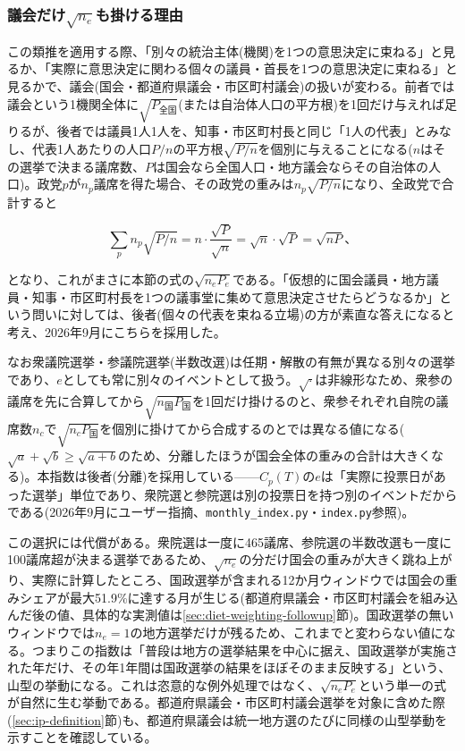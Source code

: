 \documentclass[a4paper,11pt]{ltjsarticle}
\begin{document}
\subsubsection{議会だけ$\sqrt{n_e}$も掛ける理由}

この類推を適用する際、「別々の統治主体(機関)を1つの意思決定に束ねる」と見るか、「実際に意思決定に関わる個々の議員・首長を1つの意思決定に束ねる」と見るかで、議会(国会・都道府県議会・市区町村議会)の扱いが変わる。前者では議会という1機関全体に$\sqrt{P_{\text{全国}}}$(または自治体人口の平方根)を1回だけ与えれば足りるが、後者では議員1人1人を、知事・市区町村長と同じ「1人の代表」とみなし、代表1人あたりの人口$P/n$の平方根$\sqrt{P/n}$を個別に与えることになる($n$はその選挙で決まる議席数、$P$は国会なら全国人口・地方議会ならその自治体の人口)。政党$p$が$n_p$議席を得た場合、その政党の重みは$n_p\sqrt{P/n}$になり、全政党で合計すると

\[
\sum_p n_p\sqrt{P/n} = n\cdot\frac{\sqrt{P}}{\sqrt{n}} = \sqrt{n}\cdot\sqrt{P} = \sqrt{n P}、
\]

となり、これがまさに本節の式の$\sqrt{n_eP_e}$である。「仮想的に国会議員・地方議員・知事・市区町村長を1つの議事堂に集めて意思決定させたらどうなるか」という問いに対しては、後者(個々の代表を束ねる立場)の方が素直な答えになると考え、2026年9月にこちらを採用した。

なお衆議院選挙・参議院選挙(半数改選)は任期・解散の有無が異なる別々の選挙であり、$e$としても常に別々のイベントとして扱う。$\sqrt{\cdot}$は非線形なため、衆参の議席を先に合算してから$\sqrt{n_{\text{国}}P_{\text{国}}}$を1回だけ掛けるのと、衆参それぞれ自院の議席数$n_c$で$\sqrt{n_cP_{\text{国}}}$を個別に掛けてから合成するのとでは異なる値になる($\sqrt{a}+\sqrt{b} \geq \sqrt{a+b}$のため、分離したほうが国会全体の重みの合計は大きくなる)。本指数は後者(分離)を採用している——$C_p(T)$の$e$は「実際に投票日があった選挙」単位であり、衆院選と参院選は別の投票日を持つ別のイベントだからである(2026年9月にユーザー指摘、\texttt{monthly\_index.py}・\texttt{index.py}参照)。

この選択には代償がある。衆院選は一度に465議席、参院選の半数改選も一度に100議席超が決まる選挙であるため、$\sqrt{n_e}$の分だけ国会の重みが大きく跳ね上がり、実際に計算したところ、国政選挙が含まれる12か月ウィンドウでは国会の重みシェアが最大51.9\%に達する月が生じる(都道府県議会・市区町村議会を組み込んだ後の値、具体的な実測値は\ref{sec:diet-weighting-followup}節)。国政選挙の無いウィンドウでは$n_e=1$の地方選挙だけが残るため、これまでと変わらない値になる。つまりこの指数は「普段は地方の選挙結果を中心に据え、国政選挙が実施された年だけ、その年1年間は国政選挙の結果をほぼそのまま反映する」という、山型の挙動になる。これは恣意的な例外処理ではなく、$\sqrt{n_eP_e}$という単一の式が自然に生む挙動である。都道府県議会・市区町村議会選挙を対象に含めた際(\ref{sec:ip-definition}節)も、都道府県議会は統一地方選のたびに同様の山型挙動を示すことを確認している。
\end{document}
